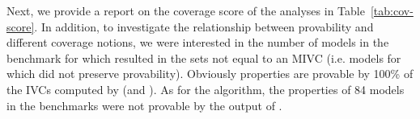 Next, we provide a report on the coverage score of the analyses in Table~\ref{tab:cov-score}. In addition, to investigate
the relationship between provability and different coverage notions,
we were interested in the number of models in the benchmark for which
\mustalg resulted in the sets not equal to an MIVC (i.e. models for which
\mustalg did not preserve provability).
Obviously properties are provable by 100\% of the IVCs computed by \ucalg (and \ucbfalg).
As for the \mustalg algorithm, the properties of 84 models in the benchmarks were not provable by the output of \mustalg.



